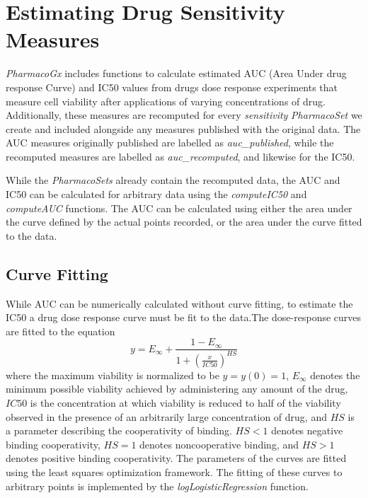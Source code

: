 \documentclass[11pt]{article}
\begin{document}
\section{Estimating Drug Sensitivity Measures}
\textit{PharmacoGx} includes functions to calculate estimated AUC (Area Under
drug response Curve) and IC50 values from drugs dose response experiments that
measure cell viability after applications of varying concentrations of drug.
Additionally, these measures are recomputed for every \textit{sensitivity}
\textit{PharmacoSet} we create and included alongside any measures published
with the original data. The AUC measures originally published are labelled as \textit{auc\_published}, while the recomputed measures are labelled as \textit{auc\_recomputed}, and likewise for the IC50.

While the \textit{PharmacoSets} already contain the recomputed data, the AUC and IC50 can be calculated for arbitrary data using the \textit{computeIC50} and \textit{computeAUC} functions. The AUC can be calculated using either the area under the curve defined by the actual points recorded, or the area under the curve fitted to the data. 

\subsection{Curve Fitting}
While AUC can be numerically calculated without curve fitting, to estimate the IC50 a drug dose response curve must be fit to the data.The dose-response curves are fitted to the equation
$$y = E_{\infty} +  \frac{ 1 - E_{\infty} }{1+(\frac{x}{IC50})^{HS}}$$
where the maximum viability is normalized to be $y = y(0) = 1$, $E_{\infty}$ denotes the minimum possible viability achieved by administering any amount of the drug, $IC50$ is the concentration at which viability is reduced to half of the viability observed in the presence of an arbitrarily large concentration of drug, and $HS$ is a parameter describing the cooperativity of binding. $HS < 1$ denotes negative binding cooperativity, $HS = 1$ denotes noncooperative binding, and $HS > 1$ denotes positive binding cooperativity. The parameters of the curves are fitted using the least squares optimization framework. The fitting of these curves to arbitrary points is implemented by the \textit{logLogisticRegression} function. 
\end{document}
